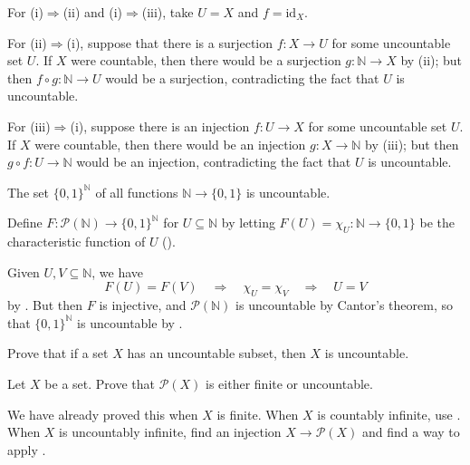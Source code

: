\begin{cproof}
For (i)$\Rightarrow$(ii) and (i)$\Rightarrow$(iii), take $U=X$ and $f=\mathrm{id}_X$.

For (ii)$\Rightarrow$(i), suppose that there is a surjection $f : X \to U$ for some uncountable set $U$. If $X$ were countable, then there would be a surjection $g : \mathbb{N} \to X$ by (ii); but then $f \circ g : \mathbb{N} \to U$ would be a surjection, contradicting the fact that $U$ is uncountable.

For (iii)$\Rightarrow$(i), suppose there is an injection $f : U \to X$ for some uncountable set $U$. If $X$ were countable, then there would be an injection $g : X \to \mathbb{N}$ by (iii); but then $g \circ f : U \to \mathbb{N}$ would be an injection, contradicting the fact that $U$ is uncountable.
\end{cproof}

\begin{proposition}
\label{propBinarySequencesAreUncountable}
The set $\{0,1\}^{\mathbb{N}}$ of all functions $\mathbb{N} \to \{0,1\}$ is uncountable.
\end{proposition}

\begin{cproof}
Define $F : \mathcal{P}(\mathbb{N}) \to \{0,1\}^{\mathbb{N}}$ for $U \subseteq \mathbb{N}$ by letting $F(U) = \chi_U : \mathbb{N} \to \{0,1\}$ be the characteristic function of $U$ ().

Given $U, V \subseteq \mathbb{N}$, we have
\[ F(U) = F(V) \quad \Rightarrow \quad \chi_U = \chi_V \quad \Rightarrow \quad U = V \]
by . But then $F$ is injective, and $\mathcal{P}(\mathbb{N})$ is uncountable by Cantor's theorem, so that $\{0,1\}^{\mathbb{N}}$ is uncountable by .
\end{cproof}

\begin{exercise}
Prove that if a set $X$ has an uncountable subset, then $X$ is uncountable.
\end{exercise}

\begin{exercise}
\label{exPowerSetFiniteOrUncountable}
Let $X$ be a set. Prove that $\mathcal{P}(X)$ is either finite or uncountable.
\begin{backhint}
We have already proved this when $X$ is finite. When $X$ is countably infinite, use . When $X$ is uncountably infinite, find an injection $X \to \mathcal{P}(X)$ and find a way to apply .
\end{backhint}
\end{exercise}

